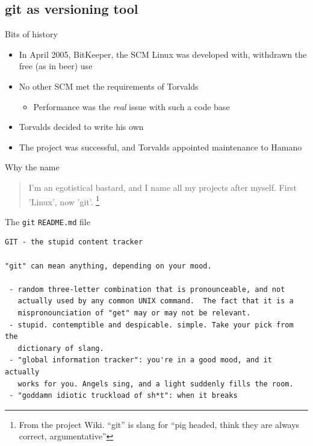 \documentclass[presentation]{beamer}
\begin{document}
\subsection{git as versioning tool}

\begin{frame}[fragile]{Bits of history}
	\begin{itemize}
		\item In April 2005, BitKeeper, the SCM Linux was developed with, withdrawn the free (as in beer) use
		\item No other SCM met the requirements of Torvalds
		\begin{itemize}
			\item Performance was the \textit{real} issue with such a code base
		\end{itemize}
		\item Torvalds decided to write his own
		\item The project was successful, and Torvalds appointed maintenance to Hamano
	\end{itemize}
	\begin{block}{Why the name}
		\begin{quote}
			I'm an egotistical bastard, and I name all my projects after myself. First 'Linux', now 'git'. \footnote{\tiny{From the project Wiki. ``git'' is slang for ``pig headed, think they are always correct, argumentative''}}
			\begin{flushright}
			\end{flushright}
		\end{quote}
	\end{block}
\end{frame}

\begin{frame}[fragile]{The \texttt{git} \texttt{README.md} file}
	\begin{block}{}
		\begin{verbatim}
GIT - the stupid content tracker

"git" can mean anything, depending on your mood.

 - random three-letter combination that is pronounceable, and not
   actually used by any common UNIX command.  The fact that it is a
   mispronounciation of "get" may or may not be relevant.
 - stupid. contemptible and despicable. simple. Take your pick from the
   dictionary of slang.
 - "global information tracker": you're in a good mood, and it actually
   works for you. Angels sing, and a light suddenly fills the room. 
 - "goddamn idiotic truckload of sh*t": when it breaks
		\end{verbatim}
	\end{block}
\end{frame}
\end{document}
